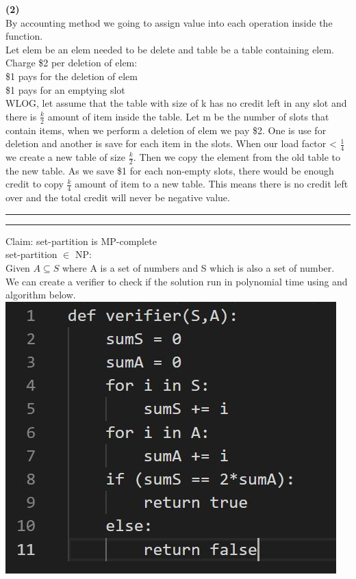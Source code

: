 \documentclass[a4paper, 11pt]{article}
\newcommand{\question}[2] {\vspace{.25in} \hrule\vspace{0.5em}
\noindent{\bf #1: #2} \vspace{0.5em}
\hrule \vspace{.10in}}
\renewcommand{\part}[1] {\vspace{.10in} {\bf (#1)}}
\begin{document}
\part{2}\\
By accounting method we going to assign value into each operation inside the function.\\
Let elem be an elem needed to be delete and table be a table containing elem.\\
Charge \$2 per deletion of elem:\\
\$1 pays for the deletion of elem\\
\$1 pays for an emptying slot\\
WLOG, let assume that the table with size of k has no credit left in any slot and there is $\frac{k}{2}$ amount of item inside the table. Let m be the number of slots that contain items, when we perform a deletion of elem we pay \$2. One is use for deletion and another is save for each item in the slots. When our load factor < $\frac{1}{4}$ we create a new table of size $\frac{k}{2}$. Then we copy the element from the old table to the new table. As we save \$1 for each non-empty slots, there would be enough credit to copy $\frac{k}{4}$ amount of item to a new table. This means there is no credit left over and the total credit will never be negative value.
\question{2}{Problem2}
Claim: set-partition is MP-complete\\
set-partition $\in$ NP:\\
Given $A \subseteq S$ where A is a set of numbers and S which is also a set of number.\\
We can create a verifier to check if the solution run in polynomial time using and algorithm below.\\
\includegraphics[width=\textwidth]{q2.jpg}\\
\end{document}
